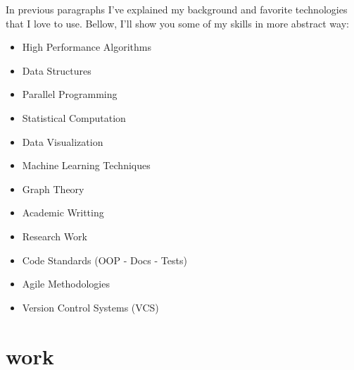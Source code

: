 \documentclass{friggeri-cv}
\newcommand{\myhref}[2]{\href[pdfnewwindow=true]{#1}{#2}}
\newcommand{\Brooktec}{\myhref{https://brooktec.com/}{Brooktec}}
\begin{document}
    In previous paragraphs I've explained my background and favorite technologies that I love to use. Bellow, I'll show you some of my skills in more abstract way:

    \noindent
    \begin{minipage}[t]{0.5\linewidth}
      \begin{itemize}
      	\item{High Performance Algorithms}
  	    \item{Data Structures}
        \item{Parallel Programming}
        \item{Statistical Computation}
        \item{Data Visualization}
        \item{Machine Learning Techniques}
      \end{itemize}
    \end{minipage}%
    \begin{minipage}[t]{0.5\linewidth}
      \begin{itemize}
        \item{Graph Theory}
      	\item{Academic Writting}
        \item{Research Work}
        \item{Code Standards (OOP - Docs - Tests)}
        \item{Agile Methodologies}
        \item{Version Control Systems (VCS)}
      \end{itemize}
    \end{minipage}
    \par\bigskip


  \pagebreak


  \section{work}

\end{document}
